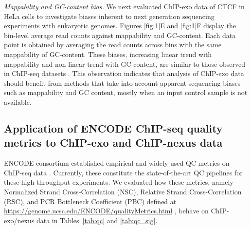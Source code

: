 \documentclass{bmcart}
\begin{document}
\textit{Mappability and GC-content bias.} We next evaluated ChIP-exo
data of CTCF in HeLa cells \cite{exo1} to investigate biases inherent
to next generation sequencing experiments with eukaryotic genomes.
Figures \ref{fig:1}E and \ref{fig:1}F display the bin-level
average read counts against mappability and GC-content. Each data
point is obtained by averaging the read counts across bins with the
same mappability of GC-content.  These biases, increasing linear trend
with mappability and non-linear trend with GC-content, are similar to
those observed in ChIP-seq datasets \cite{benjamini2011,
  mosaics,quest}.
This observation  indicates that analysis of  ChIP-exo data
should benefit from methods that take into account  apparent
sequencing biases such as mappability and GC content, mostly when an
input  control sample is not available.

\subsection*{Application of ENCODE ChIP-seq quality metrics to
  ChIP-exo and ChIP-nexus data}

ENCODE consortium established empirical and widely used QC metrics on
ChIP-seq data \cite{encode_qc}. Currently, these constitute the
state-of-the-art QC pipelines for these high throughput experiments.
We evaluated how these metrics, namely Normalized Strand
Cross-Correlation (NSC), Relative Strand Cross-Correlation (RSC), and
PCR Bottleneck Coefficient (PBC) defined at
\url{https://genome.ucsc.edu/ENCODE/qualityMetrics.html}
\cite{encode_qc}, behave on ChIP-exo/nexus data in Tables~\ref{tab:qc}
and \ref{tab:qc_sig}.

\end{document}
